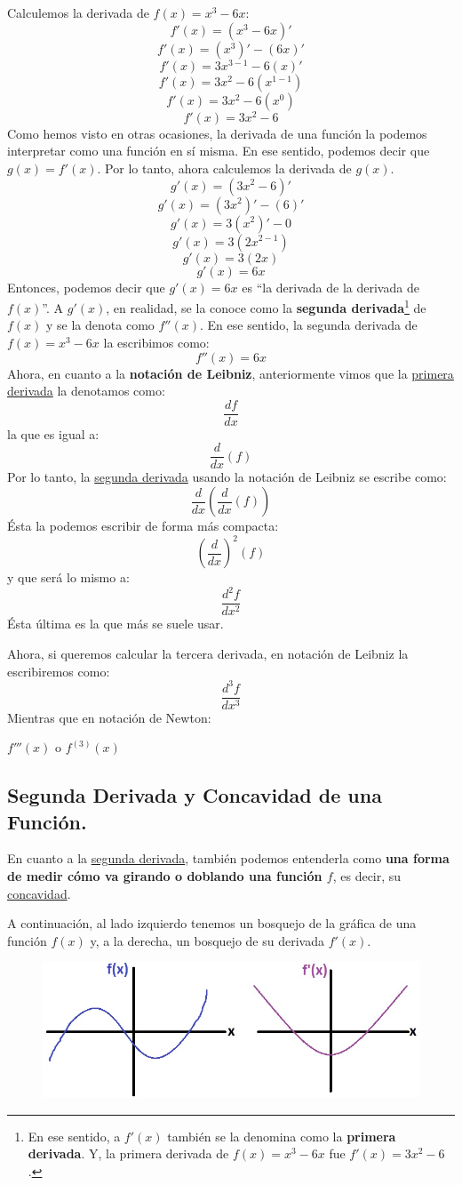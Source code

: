 \documentclass[12pt]{article}
\begin{document}
Calculemos la derivada de $f(x) = x^{3} - 6x$:
\[f'(x) = (x^{3} - 6x)'\]
\[f'(x) = (x^{3})' - (6x)'\]
\[f'(x) = 3x^{3-1} - 6(x)'\]
\[f'(x) = 3x^{2} - 6(x^{1-1})\]
\[f'(x) = 3x^{2} - 6(x^{0})\]
\[f'(x) = 3x^{2} - 6\]
Como hemos visto en otras ocasiones, la derivada de una función la podemos interpretar como una función en sí misma. En ese sentido, podemos decir que $g(x) = f'(x)$. Por lo tanto, ahora calculemos la derivada de $g(x)$.
\[g'(x) = (3x^{2} - 6)'\]
\[g'(x) = (3x^{2})' - (6)'\]
\[g'(x) = 3(x^{2})' - 0\]
\[g'(x) = 3(2x^{2-1})\]
\[g'(x) = 3(2x)\]
\[g'(x) = 6x\]
Entonces, podemos decir que $g'(x) = 6x$ es ``la derivada de la derivada de $f(x)$''. A $g'(x)$, en realidad, se la conoce como la \textbf{segunda derivada}\footnote{En ese sentido, a $f'(x)$ también se la denomina como la \textbf{primera derivada}. Y, la primera derivada de $f(x) = x^{3} - 6x$ fue $f'(x) = 3x^{2} - 6$.} de $f(x)$ y se la denota como $f''(x)$. En ese sentido, la segunda derivada de $f(x) = x^{3} - 6x$ la escribimos como:
\[f''(x) = 6x\]
Ahora, en cuanto a la \textbf{notación de Leibniz}, anteriormente vimos que la \underline{primera derivada} la denotamos como:
\[\frac{df}{dx}\]
la que es igual a:
\[\frac{d}{dx}(f)\]
Por lo tanto, la \underline{segunda derivada} usando la notación de Leibniz se escribe como:
\[\frac{d}{dx} \left(\frac{d}{dx}(f)\right)\]
Ésta la podemos escribir de forma más compacta:
\[\left(\frac{d}{dx}\right)^{2}(f)\]
y que será lo mismo a:
\[\frac{d^{2}f}{dx^{2}}\]
Ésta última es la que más se suele usar.

Ahora, si queremos calcular la tercera derivada, en notación de Leibniz la escribiremos como:
\[\frac{d^{3}f}{dx^{3}}\]
Mientras que en notación de Newton:

\centerline{$f'''(x)$ o $f^{(3)}(x)$}




\subsection{Segunda Derivada y Concavidad de una Función.}

En cuanto a la \underline{segunda derivada}, también podemos entenderla como \textbf{una forma de medir cómo va girando o doblando una función $f$}, es decir, su \underline{concavidad}.

A continuación, al lado izquierdo tenemos un bosquejo de la gráfica de una función $f(x)$ y, a la derecha, un bosquejo de su derivada $f'(x)$.

\begin{figure}[hbt!]
\centering
\includegraphics[scale=0.6]{img/concavity.jpg}
\end{figure}
\end{document}
